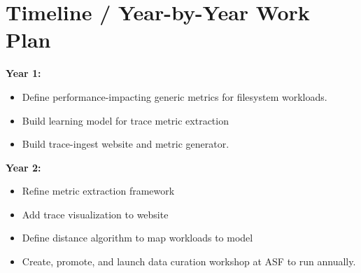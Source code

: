 \section{Timeline / Year-by-Year Work Plan}%
\label{sec:timeline}
\noindent
\textbf{Year 1:} 
\begin{itemize}
\item Define performance-impacting generic metrics for filesystem workloads.
\item Build learning model for trace metric extraction
\item Build trace-ingest website and metric generator.
\end{itemize}
\noindent
\textbf{Year 2:} 
\begin{itemize}
\item Refine metric extraction framework
\item Add trace visualization to website
\item Define distance algorithm to map workloads to model
\item Create, promote, and launch data curation workshop at ASF to run annually.
\end{itemize}

